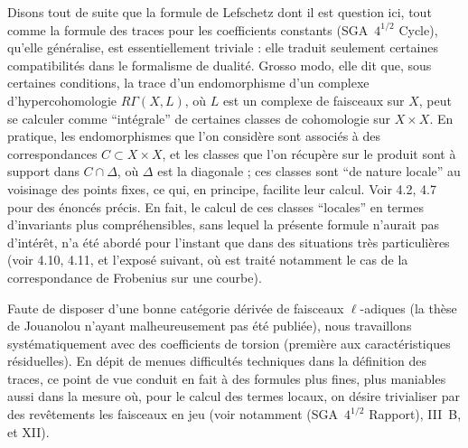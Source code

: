 Disons tout de suite que la formule de Lefschetz dont il est question ici, tout comme la formule des traces pour les coefficients constants (SGA~$4^{1/2}$ Cycle), qu'elle généralise, est essentiellement triviale : elle traduit seulement certaines compatibilités dans le formalisme de dualité. Grosso modo, elle dit que, sous certaines conditions, la trace d'un endomorphisme d'un complexe d'hypercohomologie $R\Gamma(X,L)$, où $L$ est un complexe de faisceaux sur $X$, peut se calculer comme ``intégrale'' de certaines classes de cohomologie sur $X \times X$. En pratique, les endomorphismes que l'on considère sont associés à des correspondances $C \subset X \times X$, et les classes que l'on récupère sur le produit sont à support dans $C \cap \Delta$, où $\Delta$ est la diagonale ; ces classes sont ``de nature locale'' au voisinage des points fixes, ce qui, en principe, facilite leur calcul. Voir 4.2, 4.7 pour des énoncés précis. En fait, le calcul de ces classes ``locales'' en termes d'invariants plus compréhensibles, sans lequel la présente formule n'aurait pas d'intérêt, n'a été abordé pour l'instant que dans des situations très particulières (voir 4.10, 4.11, et l'exposé suivant, où est traité notamment le cas de la correspondance de Frobenius sur une courbe).

Faute de disposer d'une bonne catégorie dérivée de faisceaux $\ell$-adiques 
(la thèse de
Jouanolou n'ayant malheureusement pas été publiée), nous travaillons systématiquement avec des coefficients de torsion (première aux caractéristiques résiduelles). En dépit de menues difficultés techniques dans la définition des traces, ce point de vue conduit en fait à des formules plus fines, plus maniables aussi dans la mesure où, pour le calcul des termes locaux, on désire trivialiser par des revêtements les faisceaux en jeu (voir notamment (SGA~$4^{1/2}$ Rapport), III~B, et XII).

